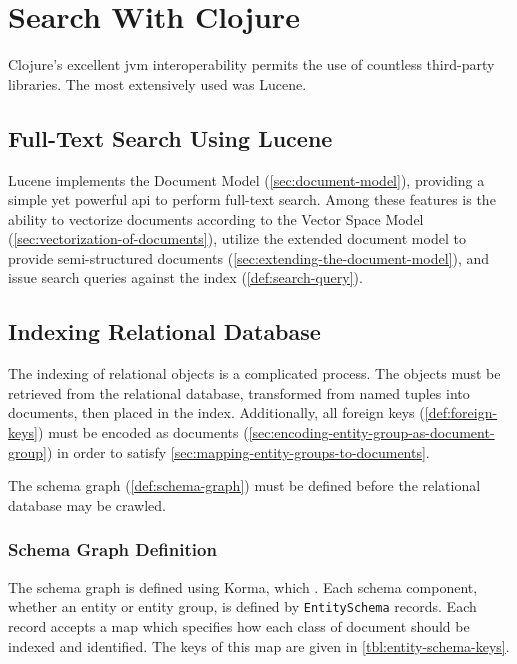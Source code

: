 \section{Search With Clojure}
	Clojure's excellent \gls{jvm} interoperability permits the use of countless third-party libraries.  The most extensively used was Lucene.
	
	\subsection{Full-Text Search Using Lucene}
		  Lucene implements the Document Model (\cref{sec:document-model}), providing a simple yet powerful \gls{api} to perform full-text search.  Among these features is the ability to vectorize documents according to the Vector Space Model (\cref{sec:vectorization-of-documents}), utilize the extended document model to provide semi-structured documents (\cref{sec:extending-the-document-model}), and issue search queries against the index (\cref{def:search-query}).
	
	\subsection{Indexing Relational Database}
		The indexing of relational objects is a complicated process.  The objects must be retrieved from the relational database, transformed from named tuples into documents, then placed in the index.  Additionally, all foreign keys (\cref{def:foreign-keys}) must be encoded as documents (\cref{sec:encoding-entity-group-as-document-group}) in order to satisfy \cref{sec:mapping-entity-groups-to-documents}.
		
		The schema graph (\cref{def:schema-graph}) must be defined before the relational database may be crawled.
		
		\subsubsection{Schema Graph Definition}
		\label{sec:entity-schema}
			The schema graph is defined using Korma, which .  Each schema component, whether an entity or entity group, is defined by \texttt{EntitySchema} records.  Each record accepts a map which specifies how each class of document should be indexed and identified.  The keys of this map are given in \vref{tbl:entity-schema-keys}.
			
